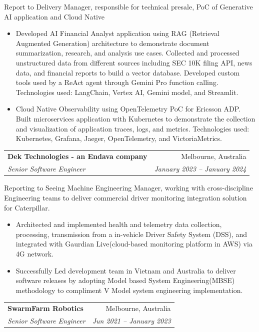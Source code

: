 \documentclass[letterpaper,11pt]{article}
\makeatletter
\newcommand{\resumeItemNoBullet}[4]{
  \vspace{-1pt}
    \begin{tabular*}{0.97\textwidth}{l@{\extracolsep{\fill}}r}
      \textbf{#1} & #2 \\
      \textit{\small#3} & \textit{\small #4} \\
    \end{tabular*}\vspace{-7pt}
}
\newcommand{\resumeSubHeadingListStart}{\begin{itemize}[leftmargin=*]}
\newcommand{\resumeSubHeadingListEnd}{\end{itemize}}
\makeatother
\begin{document}
\vspace{10pt}
{Report to Delivery Manager, responsible for technical presale, PoC of Generative AI application and Cloud Native}
  \resumeSubHeadingListStart
    \item Developed AI Financial Analyst application using RAG (Retrieval Augmented Generation) architecture to demonstrate document summarization, research, and analysis use cases. Collected and processed unstructured data from different sources including SEC 10K filing API, news data, and financial reports to build a vector database. Developed custom tools used by a ReAct agent through Gemini Pro function calling. Technologies used: LangChain, Vertex AI, Gemini model, and Streamlit.
    \item Cloud Native Observability using OpenTelemetry PoC for Ericsson ADP. Built microservices application with Kubernetes to demonstrate the collection and visualization of application traces, logs, and metrics. Technologies used: Kubernetes, Grafana, Jaeger, OpenTelemetry, and VictoriaMetrics.
  \resumeSubHeadingListEnd

\resumeItemNoBullet
{Dek Technologies - an Endava company}{Melbourne, Australia}
{Senior Software Engineer}{January 2023 -- January 2024}

\vspace{10pt}
{Reporting to Seeing Machine Engineering Manager, working with cross-discipline Engineering teams to deliver commercial driver monitoring integration solution for Caterpillar.}
  \resumeSubHeadingListStart
  \item Architected and implemented health and telemetry data collection, processing, transmission from a in-vehicle Driver Safety System (DSS), and integrated with Gaurdian Live(cloud-based monitoring platform in AWS) via 4G network.
  \item Successfully Led development team in Vietnam and Australia to deliver software releases by adopting Model based System Engineering(MBSE) methodology to compliment V Model system engineering implementation.
  \resumeSubHeadingListEnd

\resumeItemNoBullet
{SwarmFarm Robotics}{Melbourne, Australia}
{Senior Software Engineer}{Jun 2021 -- January 2023}
\end{document}

